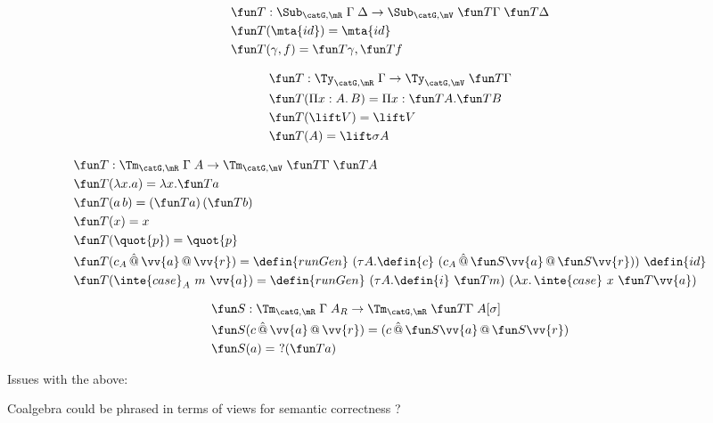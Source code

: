 \begin{align*}
   & \fun T            : \Sub_{\catG, \mR} \; \Gamma \; \Delta \to \Sub_{\catG, \mV}\; \fun T\Gamma \; \fun T\Delta \\
   & \fun T(\mta{id})  = \mta{id}                                                                                   \\
   & \fun T(\gamma, f) = \fun T \gamma , \fun T f
\end{align*}

\begin{align*}
   & \fun T            : \Ty_{\catG, \mR} \; {\Gamma} \to \Ty_{\catG, \mV}\; \fun T \Gamma \\
   & \fun T(\Pi x : A .\, B)  = \Pi x : \fun T A . \fun T B                                \\
   & \fun T(\lift V) = \lift V                                                             \\
   & \fun T(A) = \lift \sigma A
\end{align*}

\begin{align*}
   & \fun T            : \Tm_{\catG, \mR} \; {\Gamma} \; A \to \Tm_{\catG, \mV}\; {\fun T \Gamma} \; \fun T A                                                       \\
   & \fun T(\lambda x . a)  = \lambda x . \fun T a                                                                                                                  \\
   & \fun T(a \, b)  = (\fun T a) \, (\fun T b)                                                                                                                     \\
   & \fun T(x) = x                                                                                                                                                  \\
   & \fun T(\quot {p}) = \quot {p}                                                                                                                                  \\
   & \fun T(c_{A} \, \hat{@} \, \vv{a} \,@\, \vv{r}) =  \defin{runGen} \ (\tau A.\defin{c} \ (c_{A} \, \hat{@} \, \fun S \vv{a} \,@\, \fun S \vv{r})) \  \defin{id} \\
   & \fun T(\inte{case}_{A}\ m\ \vv{a}) =  \defin{runGen} \ (\tau A.\defin{i} \ \fun T m) \  (\lambda x.\, \inte{case}\ x \ \fun T\vv{a})                           \\
\end{align*}

\begin{align*}
   & \fun S            : \Tm_{\catG, \mR} \; {\Gamma} \; A_R \to \Tm_{\catG,\mR}\; {\fun T \Gamma} \; A[\sigma] \\
   & \fun S(c \, \hat{@} \, \vv{a} \,@\, \vv{r}) = (c \, \hat{@} \, \fun S \vv{a} \,@\, \fun S\vv{r})           \\
   & \fun S(a)  =\ ? (\fun T a)
\end{align*}

Issues with the above:

Coalgebra could be phrased in terms of views for semantic correctness
\cite{Allais2023-pf,Allais2023-zq} ?
